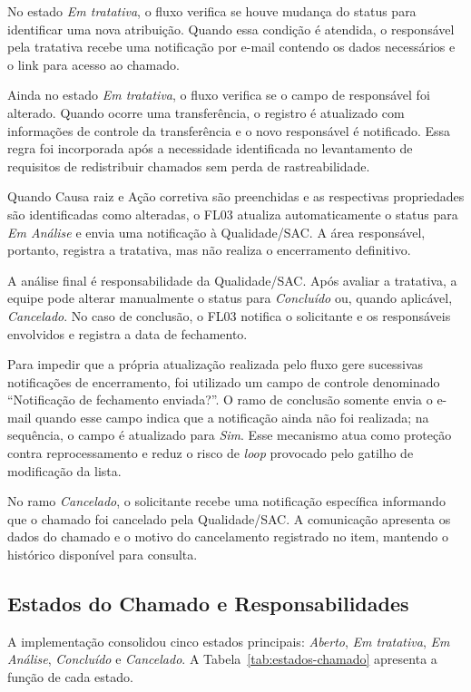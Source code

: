 No estado \textit{Em tratativa}, o fluxo verifica se houve
mudança do status para identificar uma nova atribuição.
Quando essa condição é atendida, o responsável pela
tratativa recebe uma notificação por e-mail contendo os
dados necessários e o link para acesso ao chamado.

Ainda no estado \textit{Em tratativa}, o fluxo verifica se
o campo de responsável foi alterado. Quando ocorre uma
transferência, o registro é atualizado com informações de
controle da transferência e o novo responsável é
notificado. Essa regra foi incorporada após a necessidade
identificada no levantamento de requisitos de redistribuir
chamados sem perda de rastreabilidade.

Quando Causa raiz e Ação corretiva são preenchidas e as
respectivas propriedades são identificadas como alteradas,
o FL03 atualiza automaticamente o status para
\textit{Em Análise} e envia uma notificação à
Qualidade/SAC. A área responsável, portanto, registra a
tratativa, mas não realiza o encerramento definitivo.

A análise final é responsabilidade da Qualidade/SAC. Após
avaliar a tratativa, a equipe pode alterar manualmente o
status para \textit{Concluído} ou, quando aplicável,
\textit{Cancelado}. No caso de conclusão, o FL03 notifica o
solicitante e os responsáveis envolvidos e registra a data
de fechamento.

Para impedir que a própria atualização realizada pelo
fluxo gere sucessivas notificações de encerramento, foi
utilizado um campo de controle denominado
``Notificação de fechamento enviada?''. O ramo de
conclusão somente envia o e-mail quando esse campo indica
que a notificação ainda não foi realizada; na sequência, o
campo é atualizado para \textit{Sim}. Esse mecanismo atua
como proteção contra reprocessamento e reduz o risco de
\textit{loop} provocado pelo gatilho de modificação da
lista.

No ramo \textit{Cancelado}, o solicitante recebe uma
notificação específica informando que o chamado foi
cancelado pela Qualidade/SAC. A comunicação apresenta os
dados do chamado e o motivo do cancelamento registrado no
item, mantendo o histórico disponível para consulta.

\subsection{Estados do Chamado e Responsabilidades}

A implementação consolidou cinco estados principais:
\textit{Aberto}, \textit{Em tratativa}, \textit{Em Análise},
\textit{Concluído} e \textit{Cancelado}. A
Tabela~\ref{tab:estados-chamado} apresenta a função de cada
estado.

